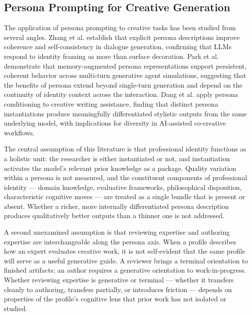 \subsection{Persona Prompting for Creative Generation}

The application of persona prompting to creative tasks has been studied from several angles. Zhang et al. \cite{zhang2018personas} establish that explicit persona descriptions improve coherence and self-consistency in dialogue generation, confirming that LLMs respond to identity framing as more than surface decoration. Park et al. \cite{park2023generative} demonstrate that memory-augmented persona representations support persistent, coherent behavior across multi-turn generative agent simulations, suggesting that the benefits of persona extend beyond single-turn generation and depend on the continuity of identity context across the interaction. Dang et al. \cite{dang2023creative} apply persona conditioning to creative writing assistance, finding that distinct persona instantiations produce meaningfully differentiated stylistic outputs from the same underlying model, with implications for diversity in AI-assisted co-creative workflows.

The central assumption of this literature is that professional identity functions as a holistic unit: the researcher is either instantiated or not, and instantiation activates the model's relevant prior knowledge as a package. Quality variation within a persona is not measured, and the constituent components of professional identity --- domain knowledge, evaluative frameworks, philosophical disposition, characteristic cognitive moves --- are treated as a single bundle that is present or absent. Whether a richer, more internally differentiated persona description produces qualitatively better outputs than a thinner one is not addressed.

A second unexamined assumption is that reviewing expertise and authoring expertise are interchangeable along the persona axis. When a profile describes how an expert evaluates creative work, it is not self-evident that the same profile will serve as a useful generative guide. A reviewer brings a terminal orientation to finished artifacts; an author requires a generative orientation to work-in-progress. Whether reviewing expertise is generative or terminal --- whether it transfers cleanly to authoring, transfers partially, or introduces friction --- depends on properties of the profile's cognitive lens that prior work has not isolated or studied.


